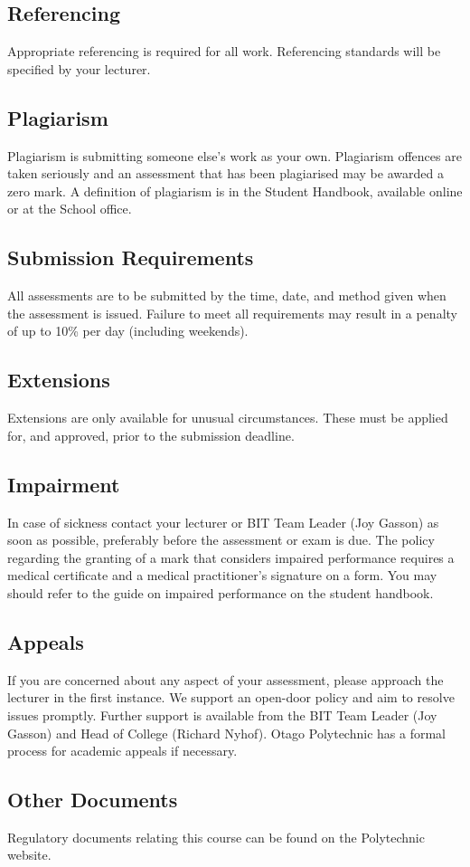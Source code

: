 \documentclass{article}
\begin{document}
\subsection*{Referencing}
Appropriate referencing is required for all work. Referencing standards will be specified by your lecturer.

\subsection*{Plagiarism}
Plagiarism is submitting someone else’s work as your own. Plagiarism offences are taken seriously and an assessment that has been plagiarised may be awarded a zero mark. A definition of plagiarism is in the Student Handbook, available online or at the School office.

\subsection*{Submission Requirements}
All assessments are to be submitted by the time, date, and method given when the assessment is issued. Failure to meet all requirements may result in a penalty of up to 10\% per day (including weekends).

\subsection*{Extensions}
Extensions are only available for unusual circumstances. These must be applied for, and approved, prior to the submission deadline.

\subsection*{Impairment}
In case of sickness contact your lecturer or BIT Team Leader (Joy Gasson) as soon as possible, preferably before the assessment or exam is due. The policy regarding the granting of a mark that considers impaired performance requires a medical certificate and a medical practitioner’s signature on a form. You may should refer to the guide on impaired performance on the student handbook.

\subsection*{Appeals}
If you are concerned about any aspect of your assessment, please approach the lecturer in the first instance. We support an open-door policy and aim to resolve issues promptly. Further support is available from the BIT Team Leader (Joy Gasson) and Head of College (Richard Nyhof). Otago Polytechnic has a formal process for academic appeals if necessary.

\subsection*{Other Documents}
Regulatory documents relating this course can be found on the Polytechnic website.
\end{document}
